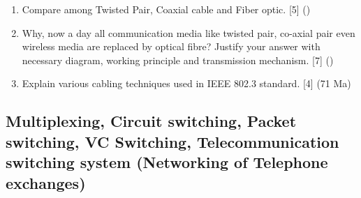 \documentclass[12pt]{article}
\begin{document}
\begin{enumerate}[noitemsep, topsep=0pt]
			\item Compare among Twisted Pair, Coaxial cable and Fiber optic. \hfill [5] ()
			
			\item Why, now a day all communication media like twisted pair, co-axial pair even wireless media are replaced by optical fibre? Justify your answer with necessary diagram, working principle and transmission mechanism. \hfill [7] ()
			
			\item Explain various cabling techniques used in IEEE 802.3 standard. \hfill [4] (71 Ma)
		\end{enumerate}

	\subsection{Multiplexing, Circuit switching, Packet switching, VC Switching, Telecommunication switching system (Networking of Telephone exchanges)}
\end{document}
